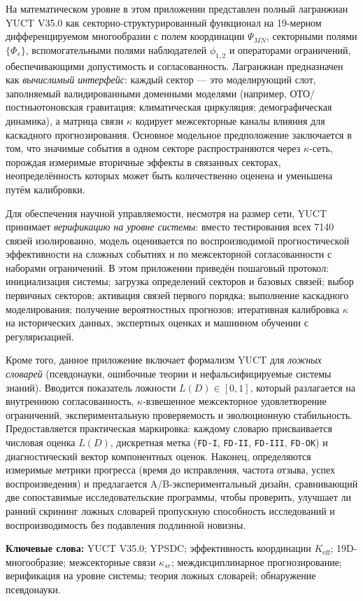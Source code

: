 \documentclass[11pt,a4paper]{article}
\newcommand{\Keff}{K_{\mathrm{eff}}}
\begin{document}
\begin{titlepage}
\begin{center}
\begin{minipage}{0.92\textwidth}
				На математическом уровне в этом приложении представлен полный лагранжиан YUCT V35.0 как секторно-структурированный функционал на 19-мерном дифференцируемом многообразии с полем координации $\Psi_{MN}$, секторными полями $\{\Phi_s\}$, вспомогательными полями наблюдателей $\phi_{1,2}$ и операторами ограничений, обеспечивающими допустимость и согласованность. Лагранжиан предназначен как \emph{вычислимый интерфейс}: каждый сектор — это моделирующий слот, заполняемый валидированными доменными моделями (например, ОТО/постньютоновская гравитация; климатическая циркуляция; демографическая динамика), а матрица связи $\kappa$ кодирует межсекторные каналы влияния для каскадного прогнозирования. Основное модельное предположение заключается в том, что значимые события в одном секторе распространяются через $\kappa$-сеть, порождая измеримые вторичные эффекты в связанных секторах, неопределённость которых может быть количественно оценена и уменьшена путём калибровки.
				
				Для обеспечения научной управляемости, несмотря на размер сети, YUCT принимает \emph{верификацию на уровне системы}: вместо тестирования всех 7140 связей изолированно, модель оценивается по воспроизводимой прогностической эффективности на сложных событиях и по межсекторной согласованности с наборами ограничений. В этом приложении приведён пошаговый протокол: инициализация системы; загрузка определений секторов и базовых связей; выбор первичных секторов; активация связей первого порядка; выполнение каскадного моделирования; получение вероятностных прогнозов; итеративная калибровка $\kappa$ на исторических данных, экспертных оценках и машинном обучении с регуляризацией.
				
				Кроме того, данное приложение включает формализм YUCT для \emph{ложных словарей} (псевдонауки, ошибочные теории и нефальсифицируемые системы знаний). Вводится показатель ложности $L(D)\in[0,1]$, который разлагается на внутреннюю согласованность, $\kappa$-взвешенное межсекторное удовлетворение ограничений, экспериментальную проверяемость и эволюционную стабильность. Предоставляется практическая маркировка: каждому словарю присваивается числовая оценка $L(D)$, дискретная метка (\texttt{FD-I}, \texttt{FD-II}, \texttt{FD-III}, \texttt{FD-OK}) и диагностический вектор компонентных оценок. Наконец, определяются измеримые метрики прогресса (время до исправления, частота отзыва, успех воспроизведения) и предлагается A/B-экспериментальный дизайн, сравнивающий две сопоставимые исследовательские программы, чтобы проверить, улучшает ли ранний скрининг ложных словарей пропускную способность исследований и воспроизводимость без подавления подлинной новизны.
			\end{minipage}
			
			\vfill
			\small
			\textbf{Ключевые слова:} YUCT V35.0; YPSDC; эффективность координации $\Keff$; 19D-многообразие; межсекторные связи $\kappa_{sr}$; междисциплинарное прогнозирование; верификация на уровне системы; теория ложных словарей; обнаружение псевдонауки.
		\end{center}
	\end{titlepage}
	
\end{document}
